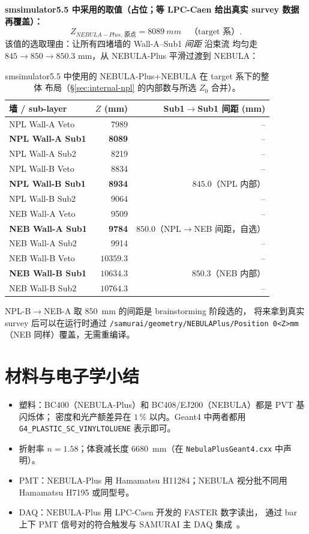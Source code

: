 \documentclass[a4paper,11pt]{ctexart}
\newcommand{\NEB}{NEBULA}
\newcommand{\NPL}{NEBULA-Plus}
\begin{document}
\textbf{smsimulator5.5 中采用的取值（占位；等 LPC-Caen 给出真实
survey 数据再覆盖）：}
\[
Z_{\NPL{},\,\text{原点}} = \SI{8089}{mm}\quad\text{（target 系）}.
\]
该值的选取理由：让所有四堵墙的 Wall-A--Sub1 \emph{间距} 沿束流
均匀走 $845 \to 850 \to 850.3$ mm，从 \NPL{} 平滑过渡到 \NEB{}：

\begin{table}[h]
\centering
\caption{smsimulator5.5 中使用的 \NPL{}+\NEB{} 在 target 系下的整体
布局（\S\ref{sec:internal-npl} 的内部数与所选 $Z_0$ 合并）。}
\begin{tabular}{lrr}
\toprule
墙 / sub-layer & $Z$ (mm) & Sub1$\to$Sub1 间距 (mm)\\
\midrule
NPL Wall-A Veto                 & 7989  & --\\
\textbf{NPL Wall-A Sub1}        & \textbf{8089}  & --\\
NPL Wall-A Sub2                 & 8219  & --\\
NPL Wall-B Veto                 & 8834  & --\\
\textbf{NPL Wall-B Sub1}        & \textbf{8934}  & $845.0$（NPL 内部）\\
NPL Wall-B Sub2                 & 9064  & --\\
NEB Wall-A Veto                 & 9509  & --\\
\textbf{NEB Wall-A Sub1}        & \textbf{9784}  & $850.0$（NPL$\to$NEB 间距，自选）\\
NEB Wall-A Sub2                 & 9914  & --\\
NEB Wall-B Veto                 & $10359.3$ & --\\
\textbf{NEB Wall-B Sub1}        & $\mathbf{10634.3}$ & $850.3$（NEB 内部）\\
NEB Wall-B Sub2                 & $10764.3$ & --\\
\bottomrule
\end{tabular}
\end{table}

NPL-B$\to$NEB-A 取 \SI{850}{mm} 的间距是 brainstorming 阶段选的，
将来拿到真实 survey 后可以在运行时通过
\texttt{/samurai/geometry/NEBULAPlus/Position 0\;<Z>\;mm}
（NEB 同样）覆盖，无需重编译。

\section{材料与电子学小结}

\begin{itemize}
  \item 塑料：BC400（\NPL{}）和 BC408/EJ200（\NEB{}）都是 PVT 基闪烁体；
        密度和光产额差异在 $1\,\%$ 以内。Geant4 中两者都用
        \texttt{G4\_PLASTIC\_SC\_VINYLTOLUENE} 表示即可。
  \item 折射率 $n = 1.58$；体衰减长度 \SI{6680}{mm}（在
        \texttt{NebulaPlusGeant4.cxx} 中声明）。
  \item PMT：\NPL{} 用 Hamamatsu H11284；\NEB{} 视分批不同用
        Hamamatsu H7195 或同型号。
  \item DAQ：\NPL{} 用 LPC-Caen 开发的 FASTER 数字读出，
        通过 bar 上下 PMT 信号对的符合触发与 SAMURAI 主 DAQ
        集成~\cite{aprApr2022}。
\end{itemize}
\end{document}
